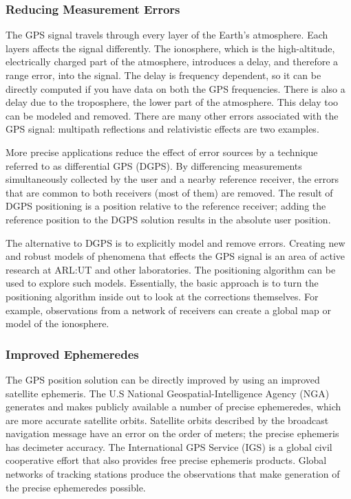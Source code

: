 \subsubsection{Reducing Measurement Errors}

The GPS signal travels through every layer of the Earth's atmosphere. Each layers affects the signal differently. The ionosphere, which is the high-altitude, electrically charged part of the atmosphere, introduces a delay, and therefore a range error, into the signal. The delay is frequency dependent, so it can be directly computed if you have data on both the GPS frequencies. There is also a delay due to the troposphere, the lower part of the atmosphere. This delay too can be modeled and removed. There are many other errors associated with the GPS signal: multipath reflections and relativistic effects are two examples.

More precise applications reduce the effect of error sources by a technique referred to as differential GPS (DGPS). By differencing measurements simultaneously collected by the user and a nearby reference receiver, the errors that are common to both receivers (most of them) are removed. The result of DGPS positioning is a position relative to the reference receiver; adding the reference position to the DGPS solution results in the absolute user position.

The alternative to DGPS is to explicitly model and remove errors. Creating new and robust models of phenomena that effects the GPS signal is an area of active research at ARL:UT and other laboratories. The positioning algorithm can be used to explore such models. Essentially, the basic approach is to turn the positioning algorithm inside out to look at the corrections themselves. For example, observations from a network of receivers can create a global map or model of the ionosphere.


\subsubsection{Improved Ephemeredes}

The GPS position solution can be directly improved by using an improved satellite ephemeris. The U.S National Geospatial-Intelligence Agency (NGA) generates and makes publicly available a number of precise ephemeredes, which are more accurate satellite orbits. Satellite orbits described by the broadcast navigation message have an error on the order of meters; the precise ephemeris has decimeter accuracy. The International GPS Service (IGS) is a global civil cooperative effort that also provides free precise ephemeris products. Global networks of tracking stations produce the observations that make generation of the precise ephemeredes possible.



